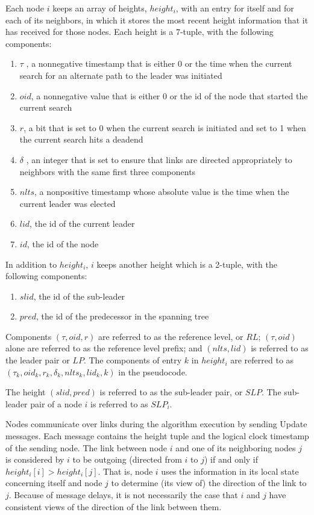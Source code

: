 \documentclass{article}
\begin{document}
Each node $i$ keeps an array of heights, $height_i$, with an entry for itself and for each of its neighbors, in which it stores the most recent height information that it has received for those nodes. Each height is a 7-tuple, with the following components:
\begin{enumerate}
\item $\tau$ , a nonnegative timestamp that is either 0 or the time when the current search for an alternate path to the leader was initiated
\item $oid$, a nonnegative value that is either 0 or the id of the node that started the current search
\item $r$, a bit that is set to 0 when the current search is initiated and set to 1 when the current search hits a deadend
\item $\delta$ , an integer that is set to ensure that links are directed appropriately to neighbors with the same first three components
\item $nlts$, a nonpositive timestamp whose absolute value is the time when the current leader was elected
\item $lid$, the id of the current leader
\item $id$, the id of the node
\end{enumerate}

In addition to $height_i$, $i$ keeps another height which is a 2-tuple, with the following components:
\begin{enumerate}
\item $slid$, the id of the sub-leader
\item $pred$, the id of the predecessor in the spanning tree
\end{enumerate}


Components $(\tau, oid, r)$ are referred to as the reference level, or $RL$; $(\tau , oid)$ alone are referred to as the reference level prefix; and $(nlts, lid)$ is referred to as the leader pair or $LP$. The components of entry $k$ in $height_i$ are referred to as $(\tau _k , oid_k, r_k, \delta _k, nlts_k, lid_k, k)$ in the pseudocode.

The height $(slid, pred)$ is referred to as the sub-leader pair, or $SLP$. The sub-leader pair of a node $i$ is referred to as $SLP_i$.

Nodes communicate over links during the algorithm execution by sending Update messages. Each message contains the height tuple and the logical clock timestamp of the sending node. The link between node $i$ and one of its neighboring nodes $j$ is considered by $i$ to be outgoing (directed from $i$ to $j$) if and only if $height_i[i] > height_i[j]$. That is, node $i$ uses the information in its local state concerning itself and node $j$ to determine (its view of) the direction of the link to $j$. Because of message delays, it is not necessarily the case that $i$ and $j$ have consistent views of the direction of the link between them.
\end{document}
